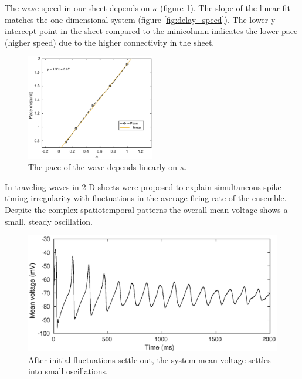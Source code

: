 The wave speed in our sheet depends on $\kappa$ (figure \ref{fig:2DWavePaceKappa}).
The slope of the linear fit matches the one-dimensional system (figure \ref{fig:delay_speed}). 
The lower y-intercept point in the sheet compared to the minicolumn indicates the lower pace (higher speed) due to the higher connectivity in the sheet.
\begin{figure}[!htb]
 \caption{ The pace of the wave depends linearly on $\kappa$.
           }
 \label{fig:2DWavePaceKappa}
 \centering
   \includegraphics[width=0.5\textwidth]{fig/2DWavePace_Kappa}
\end{figure}
\FloatBarrier



In \citet{keane2015} traveling waves in 2-D sheets were proposed to explain simultaneous spike timing irregularity with fluctuations in the average firing rate of the ensemble. 
Despite the complex spatiotemporal patterns the overall mean voltage shows a small, steady oscillation.
\begin{figure}[!htb]
 \caption{ After initial fluctuations settle out, the system mean voltage settles into small oscillations.}
 \label{fig:2D_mean_voltage}
 \centering
   \includegraphics[width=\textwidth]{fig/MeanVoltage_PBC}
\end{figure}

\FloatBarrier

